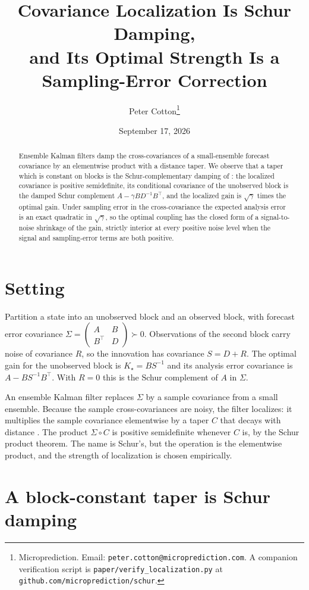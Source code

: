 \documentclass[11pt]{article}
\title{Covariance Localization Is Schur Damping,\\
and Its Optimal Strength Is a Sampling-Error Correction}
\author{Peter Cotton\thanks{Microprediction.
Email: \texttt{peter.cotton@microprediction.com}. A companion
verification script is \texttt{paper/verify\_localization.py} at
\texttt{github.com/microprediction/schur}.}}
\date{September 17, 2026}
\theoremstyle{remark}
\begin{document}
\maketitle

\begin{abstract}
Ensemble Kalman filters damp the cross-covariances of a small-ensemble
forecast covariance by an elementwise product with a distance taper. We
observe that a taper which is constant on blocks is the Schur-complementary
damping of \cite{cotton2024schur}: the localized covariance is positive
semidefinite, its conditional covariance of the unobserved block is the
damped Schur complement $A-\gamma BD^{-1}B^\top$, and the localized gain is
$\sqrt{\gamma}$ times the optimal gain. Under sampling error in the
cross-covariance the expected analysis error is an exact quadratic in
$\sqrt\gamma$, so the optimal coupling has the closed form of a
signal-to-noise shrinkage of the gain, strictly interior at every positive
noise level when the signal and sampling-error terms are both positive.
\end{abstract}

\section{Setting}

Partition a state into an unobserved block and an observed block, with
forecast error covariance
$\Sigma=\left(\begin{smallmatrix}A&B\\B^\top&D\end{smallmatrix}\right)\succ0$.
Observations of the second block carry noise of covariance $R$, so the
innovation has covariance $S=D+R$. The optimal gain for the unobserved block
is $K_\star=BS^{-1}$ and its analysis error covariance is $A-BS^{-1}B^\top$.
With $R=0$ this is the Schur complement of $A$ in $\Sigma$.

An ensemble Kalman filter \cite{evensen1994} replaces $\Sigma$ by a sample
covariance from a small ensemble. Because the sample cross-covariances are
noisy, the filter localizes: it multiplies the sample covariance elementwise
by a taper $C$ that decays with distance
\cite{houtekamer2001,hamill2001,gaspari1999}. The product $\Sigma\circ C$
is positive semidefinite whenever $C$ is, by the Schur product theorem. The
name is Schur's, but the operation is the elementwise product, and the
strength of localization is chosen empirically.

\section{A block-constant taper is Schur damping}
\end{document}

